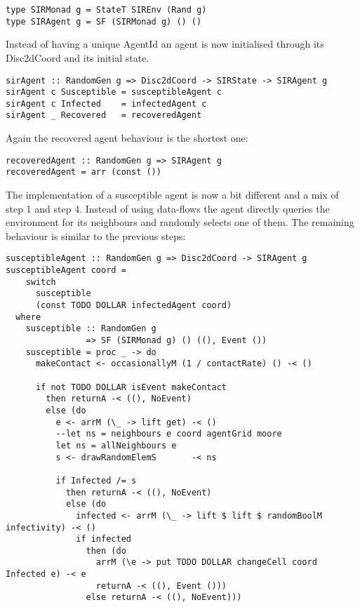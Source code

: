 \begin{verbatim}
type SIRMonad g = StateT SIREnv (Rand g)
type SIRAgent g = SF (SIRMonad g) () ()
\end{verbatim}

Instead of having a unique AgentId an agent is now initialised through its Disc2dCoord and its initial state. 

\begin{verbatim}
sirAgent :: RandomGen g => Disc2dCoord -> SIRState -> SIRAgent g
sirAgent c Susceptible = susceptibleAgent c
sirAgent c Infected    = infectedAgent c
sirAgent _ Recovered   = recoveredAgent
\end{verbatim}

Again the recovered agent behaviour is the shortest one:
\begin{verbatim}
recoveredAgent :: RandomGen g => SIRAgent g
recoveredAgent = arr (const ())
\end{verbatim}

The implementation of a susceptible agent is now a bit different and a mix of step 1 and step 4. Instead of using data-flows the agent directly queries the environment for its neighbours and randomly selects one of them. The remaining behaviour is similar to the previous steps:

\begin{verbatim}
susceptibleAgent :: RandomGen g => Disc2dCoord -> SIRAgent g
susceptibleAgent coord = 
    switch 
      susceptible
      (const TODO DOLLAR infectedAgent coord)
  where
    susceptible :: RandomGen g 
                => SF (SIRMonad g) () ((), Event ())
    susceptible = proc _ -> do
      makeContact <- occasionallyM (1 / contactRate) () -< ()

      if not TODO DOLLAR isEvent makeContact 
        then returnA -< ((), NoEvent)
        else (do
          e <- arrM (\_ -> lift get) -< ()
          --let ns = neighbours e coord agentGrid moore
          let ns = allNeighbours e
          s <- drawRandomElemS       -< ns

          if Infected /= s
            then returnA -< ((), NoEvent)
            else (do
              infected <- arrM (\_ -> lift $ lift $ randomBoolM infectivity) -< ()
              if infected 
                then (do
                  arrM (\e -> put TODO DOLLAR changeCell coord Infected e) -< e
                  returnA -< ((), Event ()))
                else returnA -< ((), NoEvent)))
\end{verbatim}

